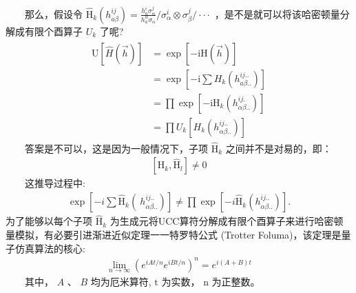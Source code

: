 \documentclass[a4paper,11pt,english]{sphinxmanual}
\begin{document}
\sphinxAtStartPar
  那么，假设令 \(\mathrm{\hat{H}}_{k}\left(h_{a \beta}^{i j}\right)=\frac{h_{a}^{i} \sigma_{\alpha}^{j}}{h_{a}^{\alpha} \sigma_{\alpha}} / \sigma_{\alpha}^{i} \otimes \sigma_{\beta}^{j} /  \cdot\cdot\cdot\) ，是不是就可以将该哈密顿量分解成有限个酉算子 \(U_k\) 了呢?
\begin{equation*}
\begin{split}\begin{aligned} \mathrm{U}[\hat{H}(\vec{h})] &=\exp [-\mathrm{iH}(\vec{h})] \\ &=\exp \left[-\mathrm{i} \sum H_{k}\left(h_{a \beta . .}^{i j ..}\right)\right] \\ &=\prod \exp \left[-\mathrm{i} \mathrm{H}_{k}\left(h_{\alpha \beta . .}^{i j . }\right)\right] \\ &= \prod U_{k}\left[H_{k}\left(h_{\alpha \beta . .}^{i j . .}\right)\right] \end{aligned}\end{split}
\end{equation*}
\sphinxAtStartPar
  答案是不可以，这是因为一般情况下，子项 \(\mathrm{\hat{H}}_k\) 之间并不是对易的，即：
\begin{equation*}
\begin{split}\left[\mathrm{\hat{H}}_{k}, \mathrm{\hat{H}}_{l}\right] \neq 0\end{split}
\end{equation*}
\sphinxAtStartPar
  这推导过程中:
\begin{equation*}
\begin{split}\exp \left[-i \sum \mathrm{\hat{H}}_{k} \left( \ h_{\alpha \beta  . .}^{i j ..}\right)\right] \neq \prod \exp \left[-i\mathrm{\hat{H}}_{k}\left(h_{\alpha \beta . .}^{i j ..}\right)\right].\end{split}
\end{equation*}
\sphinxAtStartPar
为了能够以每个子项 \(\mathrm{\hat{H}}_k\) 为生成元将UCC算符分解成有限个酉算子来进行哈密顿量模拟，有必要引进渐进近似定理一一特罗特公式 (Trotter Foluma)，该定理是量子仿真算法的核心:
\begin{equation*}
\begin{split}\lim _{n \rightarrow \infty}\left(e^{i A t / n} e^{i B t / n}\right)^{n}=e^{i(A+B) t}\end{split}
\end{equation*}
\sphinxAtStartPar
  其中， \(A\) 、 \(B\) 均为厄米算符,  \(\mathrm{t}\) 为实数， \(\mathrm{n}\) 为正整数。
\end{document}
